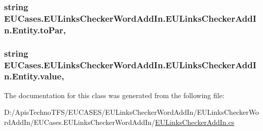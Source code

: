 \hypertarget{class_e_u_cases_1_1_e_u_links_checker_word_add_in_1_1_e_u_links_checker_add_in_1_1_entity_acc494caf329d801f0056b4aebd1e6e6d}{
\subsubsection[{to\+Par}]{\setlength{\rightskip}{0pt plus 5cm}string E\+U\+Cases.\+E\+U\+Links\+Checker\+Word\+Add\+In.\+E\+U\+Links\+Checker\+Add\+In.\+Entity.\+to\+Par\hspace{0.3cm}{\ttfamily [get]}, {\ttfamily [set]}}}\label{class_e_u_cases_1_1_e_u_links_checker_word_add_in_1_1_e_u_links_checker_add_in_1_1_entity_acc494caf329d801f0056b4aebd1e6e6d}
\hypertarget{class_e_u_cases_1_1_e_u_links_checker_word_add_in_1_1_e_u_links_checker_add_in_1_1_entity_a65505a34fcc7992350fb69371cc85d28}{
\subsubsection[{value}]{\setlength{\rightskip}{0pt plus 5cm}string E\+U\+Cases.\+E\+U\+Links\+Checker\+Word\+Add\+In.\+E\+U\+Links\+Checker\+Add\+In.\+Entity.\+value\hspace{0.3cm}{\ttfamily [get]}, {\ttfamily [set]}}}\label{class_e_u_cases_1_1_e_u_links_checker_word_add_in_1_1_e_u_links_checker_add_in_1_1_entity_a65505a34fcc7992350fb69371cc85d28}


The documentation for this class was generated from the following file\+:\begin{DoxyCompactItemize}
\item 
D\+:/\+Apis\+Techno\+T\+F\+S/\+E\+U\+C\+A\+S\+E\+S/\+E\+U\+Links\+Checker\+Word\+Add\+In/\+E\+U\+Links\+Checker\+Word\+Add\+In/\+E\+U\+Cases.\+E\+U\+Links\+Checker\+Word\+Add\+In/\hyperlink{_e_u_links_checker_add_in_8cs}{E\+U\+Links\+Checker\+Add\+In.\+cs}\end{DoxyCompactItemize}
